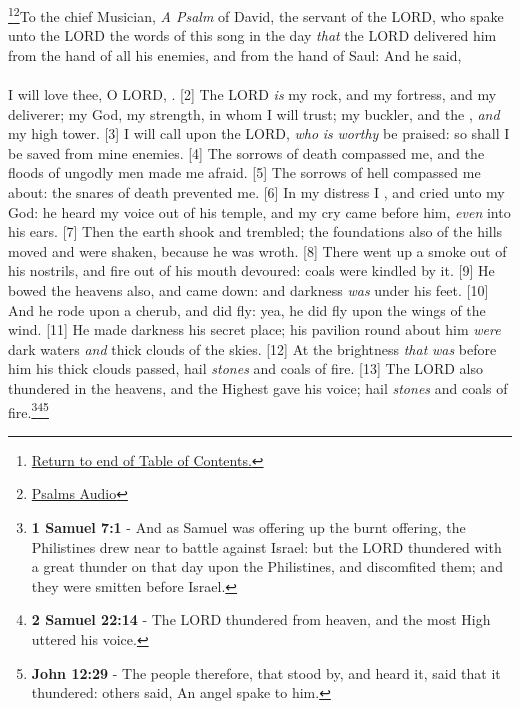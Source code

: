 \footnote{\textcolor[cmyk]{0.99998,1,0,0}{\hyperlink{TOC}{Return to end of Table of Contents.}}}\footnote{\href{https://www.audioverse.org/english/audiobibles/books/ENGKJV/O/Ps/1}{\textcolor[cmyk]{0.99998,1,0,0}{Psalms Audio}}}\textcolor[cmyk]{0.99998,1,0,0}{To the chief Musician, \emph{A Psalm} of David, the servant of the LORD, who spake unto the LORD the words of this song in the day \emph{that} the LORD delivered him from the hand of all his enemies, and from the hand of Saul: And he said,}\\
\\
\textcolor[cmyk]{0.99998,1,0,0}{I will love thee, O LORD, .}
[2] \textcolor[cmyk]{0.99998,1,0,0}{The LORD \emph{is} my rock, and my fortress, and my deliverer; my God, my strength, in whom I will trust; my buckler, and the , \emph{and} my high tower.}
[3] \textcolor[cmyk]{0.99998,1,0,0}{I will call upon the LORD, \emph{who} \emph{is} \emph{worthy}  be praised: so shall I be saved from mine enemies.}
[4] \textcolor[cmyk]{0.99998,1,0,0}{The sorrows of death compassed me, and the floods of ungodly men made me afraid.}
[5] \textcolor[cmyk]{0.99998,1,0,0}{The sorrows of hell compassed me about: the snares of death prevented me.}
[6] \textcolor[cmyk]{0.99998,1,0,0}{In my distress I , and cried unto my God: he heard my voice out of his temple, and my cry came before him, \emph{even} into his ears.}
[7] \textcolor[cmyk]{0.99998,1,0,0}{Then the earth shook and trembled; the foundations also of the hills moved and were shaken, because he was wroth.}
[8] \textcolor[cmyk]{0.99998,1,0,0}{There went up a smoke out of his nostrils, and fire out of his mouth devoured: coals were kindled by it.}
[9] \textcolor[cmyk]{0.99998,1,0,0}{He bowed the heavens also, and came down: and darkness \emph{was} under his feet.}
[10] \textcolor[cmyk]{0.99998,1,0,0}{And he rode upon a cherub, and did fly: yea, he did fly upon the wings of the wind.}
[11] \textcolor[cmyk]{0.99998,1,0,0}{He made darkness his secret place; his pavilion round about him \emph{were} dark waters \emph{and} thick clouds of the skies.}
[12] \textcolor[cmyk]{0.99998,1,0,0}{At the brightness \emph{that} \emph{was} before him his thick clouds passed, hail \emph{stones} and coals of fire.}
[13] \textcolor[cmyk]{0.99998,1,0,0}{The LORD also thundered in the heavens, and the Highest gave his voice; hail \emph{stones} and coals of fire.}\footnote{\textbf{1 Samuel 7:1} - And as Samuel was offering up the burnt offering, the Philistines drew near to battle against Israel: but the LORD thundered with a great thunder on that day upon the Philistines, and discomfited them; and they were smitten before Israel.}\footnote{\textbf{2 Samuel 22:14} -  The LORD thundered from heaven, and the most High uttered his voice.}\footnote{\textbf{John 12:29} - The people therefore, that stood by, and heard it, said that it thundered: others said, An angel spake to him.}
